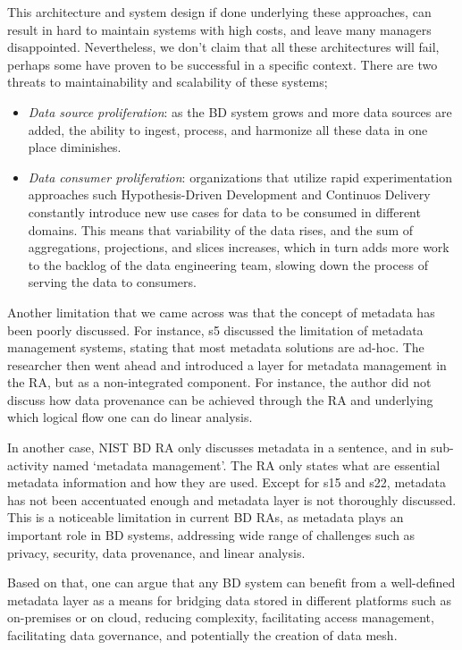 \documentclass{ieeeaccess}
\begin{document}
This architecture and system design if done underlying these approaches, can result in hard to maintain systems with high costs, and leave many managers disappointed.
Nevertheless, we don't claim that all these architectures will fail, perhaps some have proven to be successful in a specific context. There are two threats to maintainability and scalability of these systems; 

\begin{itemize}
    \item \emph{Data source proliferation}: as the BD system grows and more data
    sources are added, the ability to ingest, process, and harmonize all these data in one place diminishes.
    \item \emph{Data consumer proliferation}: organizations that utilize rapid experimentation approaches such Hypothesis-Driven Development and Continuos Delivery constantly introduce new use cases for data to be consumed in different domains. This means that variability of the data rises, and the sum of aggregations, projections, and slices increases, which in turn adds more work to the backlog of the data engineering team, slowing
    down the process of serving the data to consumers.
\end{itemize}

Another limitation that we came across was that the concept of metadata has been poorly discussed. For instance, s5 discussed the limitation of metadata management systems, stating that most metadata solutions are ad-hoc. The researcher then went ahead and introduced a layer for metadata management in the RA, but as a non-integrated component. For instance, the author did not discuss how data provenance can be achieved through the RA and underlying which logical flow one can do linear analysis. 

In another case, NIST BD RA only discusses metadata in a sentence, and in sub-activity named ‘metadata management’. The RA only states what are essential metadata information and how they are used. Except for s15 and s22, metadata has not been accentuated enough and metadata layer is not thoroughly discussed. This is a noticeable limitation in current BD RAs, as metadata plays an important role in BD systems, addressing wide range of challenges such as privacy, security, data provenance, and linear analysis. 

Based on that, one can argue that any BD system can benefit from a well-defined metadata layer as a means for bridging data stored in different platforms such as on-premises or on cloud, reducing complexity, facilitating access management, facilitating data governance, and potentially the creation of data mesh.
\end{document}
